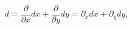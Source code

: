 \begin{equation}
d=\frac \partial {\partial x}dx+\frac \partial {\partial y}dy=\partial
_xdx+\partial _ydy,
\end{equation}


